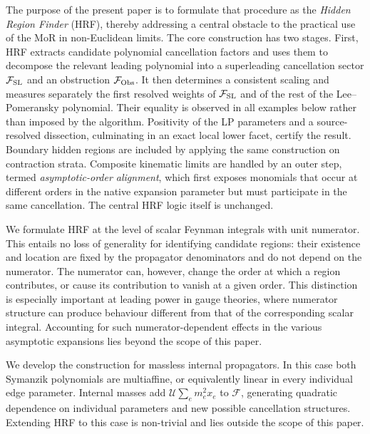 \documentclass[a4paper,11pt]{article}
\begin{document}
The purpose of the present paper is to formulate that procedure as the
\emph{Hidden Region Finder} (HRF), thereby addressing a central obstacle to
the practical use of the MoR in non-Euclidean limits.  The core construction
has two stages.
First, HRF extracts candidate polynomial cancellation factors and uses them
to decompose the relevant leading polynomial into a superleading
cancellation sector \(\mathcal F_{\rm SL}\) and an obstruction
\(\mathcal F_{\rm Obs}\).  It then determines a consistent scaling and
measures separately the first resolved weights of \(\mathcal F_{\rm SL}\)
and of the rest of the Lee--Pomeransky polynomial.  Their equality is
observed in all examples below rather than imposed by the algorithm.
Positivity of the LP parameters and a source-resolved dissection, culminating
in an exact local lower facet, certify the result.  Boundary
hidden regions are included by applying the same construction on contraction
strata.
Composite kinematic limits are handled by an outer step, termed
\emph{asymptotic-order alignment}, which first exposes monomials that occur at
different orders in the native expansion parameter but must participate in
the same cancellation.  The central HRF logic itself is unchanged.

We formulate HRF at the level of scalar Feynman integrals with unit
numerator.  This entails no loss of generality for identifying candidate
regions: their existence and location are fixed by the propagator
denominators and do not depend on the numerator.  The numerator can,
however, change the order at which a region contributes, or cause its
contribution to vanish at a given order.  This distinction is especially
important at
leading power in gauge theories, where numerator structure can produce
behaviour different from that of the corresponding scalar integral.
Accounting for such numerator-dependent effects in the various asymptotic
expansions lies beyond the scope of this paper.

We develop the construction for massless internal propagators.  In this case
both Symanzik polynomials are multiaffine, or equivalently linear in every
individual edge parameter.  Internal masses add
\(\mathcal U\sum_e m_e^2x_e\) to \(\mathcal F\), generating quadratic
dependence on individual parameters and new possible cancellation
structures.  Extending HRF to this case is non-trivial and lies outside the
scope of this paper.
\end{document}
